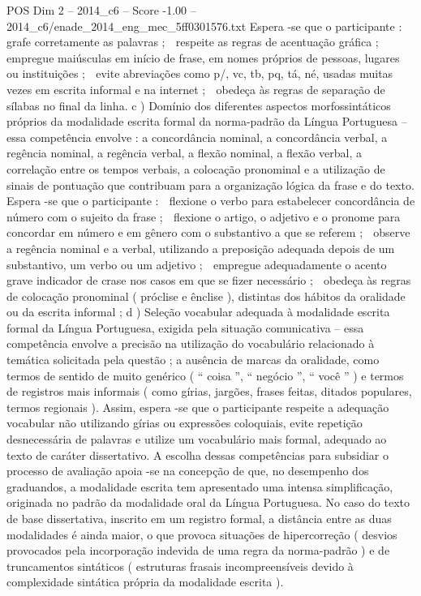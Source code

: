 \begin{textsample}{POS Dim 2 – 2014\_c6 – Score -1.00 – 2014\_c6/enade\_2014\_eng\_mec\_5ff0301576.txt}
Espera -se que o participante :  grafe corretamente as palavras ;  respeite as regras de acentuação gráfica ;  empregue maiúsculas em início de frase, em nomes próprios de pessoas, lugares ou instituições ;  evite abreviações como p/, vc, tb, pq, tá, né, usadas muitas vezes em escrita informal e na internet ;  obedeça às regras de separação de sílabas no final da linha. c ) Domínio dos diferentes aspectos morfossintáticos próprios da modalidade escrita formal da norma-padrão da Língua Portuguesa – essa competência envolve : a concordância nominal, a concordância verbal, a regência nominal, a regência verbal, a flexão nominal, a flexão verbal, a correlação entre os tempos verbais, a colocação pronominal e a utilização de sinais de pontuação que contribuam para a organização lógica da frase e do texto.
Espera -se que o participante :  flexione o verbo para estabelecer concordância de número com o sujeito da frase ;  flexione o artigo, o adjetivo e o pronome para concordar em número e em gênero com o substantivo a que se referem ;  observe a regência nominal e a verbal, utilizando a preposição adequada depois de um substantivo, um verbo ou um adjetivo ;  empregue adequadamente o acento grave indicador de crase nos casos em que se fizer necessário ;  obedeça às regras de colocação pronominal ( próclise e ênclise ), distintas dos hábitos da oralidade ou da escrita informal ; d ) Seleção vocabular adequada à modalidade escrita formal da Língua Portuguesa, exigida pela situação comunicativa – essa competência envolve a precisão na utilização do vocabulário relacionado à temática solicitada pela questão ; a ausência de marcas da oralidade, como termos de sentido de muito genérico ( “ coisa ”, “ negócio ”, “ você ” ) e termos de registros mais informais ( como gírias, jargões, frases feitas, ditados populares, termos regionais ).
Assim, espera -se que o participante respeite a adequação vocabular não utilizando gírias ou expressões coloquiais, evite repetição desnecessária de palavras e utilize um vocabulário mais formal, adequado ao texto de caráter dissertativo.
A escolha dessas competências para subsidiar o processo de avaliação apoia -se na concepção de que, no desempenho dos graduandos, a modalidade escrita tem apresentado uma intensa simplificação, originada no padrão da modalidade oral da Língua Portuguesa.
No caso do texto de base dissertativa, inscrito em um registro formal, a distância entre as duas modalidades é ainda maior, o que provoca situações de hipercorreção ( desvios provocados pela incorporação indevida de uma regra da norma-padrão ) e de truncamentos sintáticos ( estruturas frasais incompreensíveis devido à complexidade sintática própria da modalidade escrita ).

\end{textsample}
